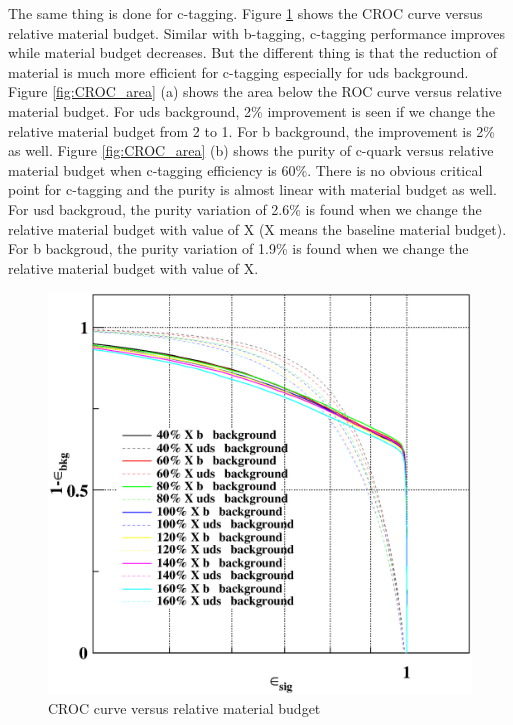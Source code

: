 \documentclass[usetikz]{style/cepcnote}
\begin{document}
The same thing is done for c-tagging. Figure \ref{fig:CROC_material} shows the CROC curve versus relative material budget. Similar with b-tagging, c-tagging performance improves while material budget decreases. But the different thing is that the reduction of material is much more efficient for c-tagging especially for uds background. Figure \ref{fig:CROC_area} (a) shows the area below the ROC curve versus relative material budget. For uds background, 2\% improvement is seen if we change the relative material budget from 2 to 1. For b background, the improvement is 2\% as well. Figure \ref{fig:CROC_area} (b) shows the purity of c-quark versus relative material budget when c-tagging efficiency is 60\%. There is no obvious critical point for c-tagging and the purity is almost linear with material budget as well.  For usd backgroud, the purity variation of 2.6\% is found when we change the relative material budget with value of X (X means the baseline material budget). For b backgroud, the purity variation of 1.9\% is found when we change the relative material budget with value of X.
\begin{figure}[!ht]
	\centering
	\includegraphics[scale=0.5]{figures/CROC-lcfiweights-test.eps}
	\caption{CROC curve versus relative material budget}
	\label{fig:CROC_material}
\end{figure}
\end{document}
